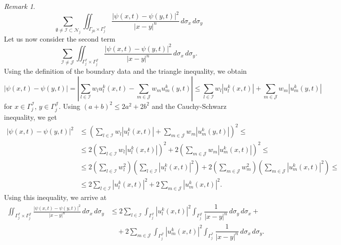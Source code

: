 \documentclass[a4paper, 11pt]{article}
\theoremstyle{remark}
\newtheorem{remark}[equation]{Remark}
\begin{document}
\begin{remark}
    \begin{equation*}
        \sum_{\emptyset\neq\mathcal{I}\subset\mathcal{N}_{j}} \iint_{\Gamma_{j0} \times \Gamma_j^{\mathcal{I}}} \frac{|\psi(x, t)-\psi(y, t)|^2}{|x-y|^n} \, d\sigma_x \, d\sigma_y
    \end{equation*}
    Let us now consider the second term
    \begin{equation*}
        \sum_{\mathcal{I}\neq\mathcal{J}} \iint_{\Gamma_j^{\mathcal{I}} \times \Gamma_j^{\mathcal{J}}} \frac{|\psi(x, t)-\psi(y, t)|^2}{|x-y|^n} \, d\sigma_x \, d\sigma_y.
    \end{equation*}
    Using the definition of the boundary data and the triangle inequality, we obtain
    \begin{equation*}
        |\psi(x, t) - \psi(y, t)| = \left|\sum_{l\in\mathcal{I}}w_{l}u_{l}^{k}(x, t) - \sum_{m\in\mathcal{J}}w_{m}u_{m}^{k}(y, t)\right| \leq \sum_{l\in\mathcal{I}}w_{l}|u_{l}^{k}(x, t)| + \sum_{m\in\mathcal{J}}w_{m}|u_{m}^{k}(y, t)|
    \end{equation*}
    for $x\in \Gamma_{j}^{\mathcal{I}}$, $y\in \Gamma_{j}^{\mathcal{J}}$. Using $(a+b)^{2}\leq 2a^{2} + 2b^{2}$ and the Cauchy-Schwarz inequality, we get
    \begin{align*}
        |\psi(x, t) - \psi(y, t)|^{2} &\leq \left(\sum_{l\in\mathcal{I}}w_{l}|u_{l}^{k}(x, t)| + \sum_{m\in\mathcal{J}}w_{m}|u_{m}^{k}(y, t)|\right)^{2} \leq \\
        &\leq 2\left(\sum_{l\in\mathcal{I}}w_{l}|u_{l}^{k}(x, t)|\right)^{2} + 2\left(\sum_{m\in\mathcal{J}}w_{m}|u_{m}^{k}(x, t)|\right)^{2}\leq\\
        &\leq 2\left(\sum_{l\in\mathcal{I}}w_{l}^{2}\right)\left(\sum_{l\in\mathcal{I}}|u_{l}^{k}(x, t)|^{2}\right) + 2\left(\sum_{m\in\mathcal{J}}w_{m}^{2}\right)\left(\sum_{m\in\mathcal{J}}|u_{m}^{k}(x, t)|^{2}\right)\leq\\
        &\leq 2\sum_{l\in\mathcal{I}}|u_{l}^{k}(x, t)|^{2} + 2\sum_{m\in\mathcal{J}}|u_{m}^{k}(x, t)|^{2}.
    \end{align*}
    Using this inequality, we arrive at
    \begin{align*}
        \iint_{\Gamma_j^{\mathcal{I}} \times \Gamma_j^{\mathcal{J}}} \frac{|\psi(x, t)-\psi(y, t)|^2}{|x-y|^n} \, d\sigma_x \, d\sigma_y &\leq 2\sum_{l\in\mathcal{I}}\int_{\Gamma_j^{\mathcal{I}}}|u_{l}^{k}(x, t)|^{2} \int_{\Gamma_j^{\mathcal{J}}}\dfrac{1}{|x-y|^n}\,d\sigma_y\,d\sigma_x + \\
        &\quad +2\sum_{m\in\mathcal{J}}\int_{\Gamma_j^{\mathcal{J}}}|u_{m}^{k}(x, t)|^{2} \int_{\Gamma_j^{\mathcal{I}}}\dfrac{1}{|x-y|^n}\,d\sigma_x\,d\sigma_y.
    \end{align*}
    

\end{remark}
\end{document}
